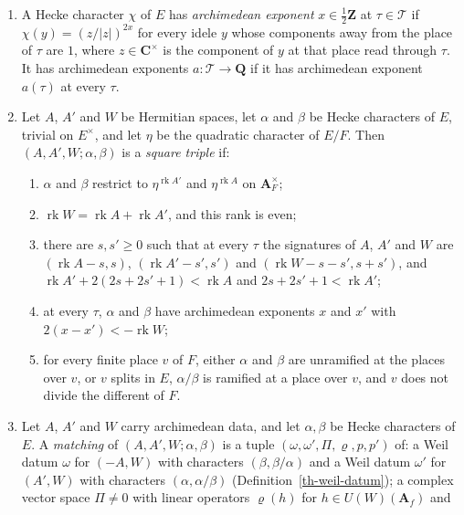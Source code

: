 \begin{definition}
\begin{enumerate}
  vectors $f\otimes P$ for archimedean vacua $f$ and $P\in\mathcal P(S,T)$.
\item A Hecke character $\chi$ of $E$ has \emph{archimedean exponent}
  $x\in\frac12\mathbf Z$ at $\tau\in\mathcal T$ if $\chi(y)=(z/|z|)^{2x}$ for
  every idele $y$ whose components away from the place of $\tau$ are $1$, where
  $z\in\mathbf C^\times$ is the component of $y$ at that place read through
  $\tau$. It has archimedean exponents $a\colon\mathcal T\to\mathbf Q$ if it
  has archimedean exponent $a(\tau)$ at every $\tau$.
\item Let $A$, $A'$ and $W$ be Hermitian spaces, let $\alpha$ and $\beta$ be
  Hecke characters of $E$, trivial on $E^\times$, and let $\eta$ be the
  quadratic character of $E/F$. Then $(A,A',W;\alpha,\beta)$ is a
  \emph{square triple} if:
  \begin{enumerate}
  \item[(a)] $\alpha$ and $\beta$ restrict to $\eta^{\operatorname{rk}A'}$ and
    $\eta^{\operatorname{rk}A}$ on $\mathbf A_F^\times$;
  \item[(b)] $\operatorname{rk}W=\operatorname{rk}A+\operatorname{rk}A'$, and
    this rank is even;
  \item[(c)] there are $s,s'\geq0$ such that at every $\tau$ the signatures of
    $A$, $A'$ and $W$ are $(\operatorname{rk}A-s,s)$,
    $(\operatorname{rk}A'-s',s')$ and $(\operatorname{rk}W-s-s',s+s')$, and
    $\operatorname{rk}A'+2(2s+2s'+1)<\operatorname{rk}A$ and
    $2s+2s'+1<\operatorname{rk}A'$;
  \item[(d)] at every $\tau$, $\alpha$ and $\beta$ have archimedean exponents
    $x$ and $x'$ with $2(x-x')<-\operatorname{rk}W$;
  \item[(e)] for every finite place $v$ of $F$, either $\alpha$ and $\beta$ are
    unramified at the places over $v$, or $v$ splits in $E$, $\alpha/\beta$ is
    ramified at a place over $v$, and $v$ does not divide the different of $F$.
  \end{enumerate}
\item Let $A$, $A'$ and $W$ carry archimedean data, and let $\alpha,\beta$ be
  Hecke characters of $E$. A \emph{matching} of $(A,A',W;\alpha,\beta)$ is a
  tuple $(\omega,\omega',\Pi,\varrho,p,p')$ of: a Weil datum $\omega$ for
  $(-A,W)$ with characters $(\beta,\beta/\alpha)$ and a Weil datum $\omega'$
  for $(A',W)$ with characters $(\alpha,\alpha/\beta)$
  (Definition~\ref{th-weil-datum}); a complex vector space $\Pi\neq0$ with
  linear operators $\varrho(h)$ for $h\in U(W)(\mathbf A_f)$ and

\end{enumerate}
\end{definition}
